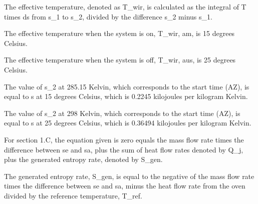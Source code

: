 The effective temperature, denoted as T_{wir}, is calculated as the integral of T times ds from s_1 to s_2, divided by the difference s_2 minus s_1.

The effective temperature when the system is on, T_{wir, am}, is 15 degrees Celsius.

The effective temperature when the system is off, T_{wir, aus}, is 25 degrees Celsius.

The value of s_2 at 285.15 Kelvin, which corresponds to the start time (AZ), is equal to s at 15 degrees Celsius, which is 0.2245 kilojoules per kilogram Kelvin.

The value of s_2 at 298 Kelvin, which corresponds to the start time (AZ), is equal to s at 25 degrees Celsius, which is 0.36494 kilojoules per kilogram Kelvin.

For section 1.C, the equation given is zero equals the mass flow rate times the difference between se and sa, plus the sum of heat flow rates denoted by Q_j, plus the generated entropy rate, denoted by S_gen.

The generated entropy rate, S_gen, is equal to the negative of the mass flow rate times the difference between se and sa, minus the heat flow rate from the oven divided by the reference temperature, T_ref.